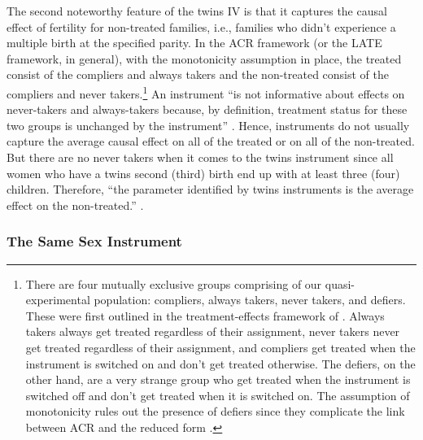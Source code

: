 The second noteworthy feature of the twins IV is that it captures the causal effect of fertility for non-treated families, i.e., families who didn't experience a multiple birth at the specified parity. In the ACR framework (or the LATE framework, in general), with the monotonicity assumption in place, the treated consist of the compliers and always takers and the non-treated consist of the compliers and never takers.\footnote{ There are four mutually exclusive groups comprising of our quasi-experimental population: compliers, always takers, never takers, and defiers. These were first outlined in the treatment-effects framework of \textcite{angrist_identification_1996}. Always takers always get treated regardless of their assignment, never takers never get treated regardless of their assignment, and compliers get treated when the instrument is switched on and don't get treated otherwise. The defiers, on the other hand, are a very strange group who get treated when the instrument is switched off and don't get treated when it is switched on. The assumption of monotonicity rules out the presence of defiers since they complicate the link between ACR and the reduced form \parencite{Angrist2009}. } An instrument \enquote{is not informative about effects on never-takers and always-takers because, by definition, treatment status for these two groups is unchanged by the instrument} \parencite[p.~158]{Angrist2009}. Hence, instruments do not usually capture the average causal effect on all of the treated or on all of the non-treated. But there are no never takers when it comes to the twins instrument since all women who have a twins second (third) birth end up with at least three (four) children. Therefore, \enquote{the parameter identified by twins instruments is the average effect on the non-treated.} \parencite[p.~788]{angrist_multiple_2010}.



\subsubsection{The Same Sex Instrument}
\label{section:samesx}

